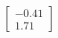 \documentclass[preview]{standalone}
\begin{document}
\begin{align*}
\begin{bmatrix} -0.41 \\ 1.71 \end{bmatrix}
\end{align*}
\end{document}
